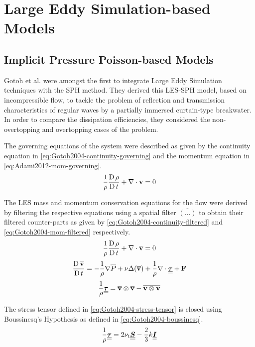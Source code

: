 \section{Large Eddy Simulation-based Models}
\subsection{Implicit Pressure Poisson-based Models}
\label{sec:Implicit-Pressure-Poisson-based-Models}
Gotoh et al. \parencite{Gotoh2004} were amongst the first to integrate Large Eddy Simulation techniques with the SPH method. They derived this LES-SPH model, based on incompressible flow, to tackle the problem of reflection and transmission characteristics of regular waves by a partially immersed curtain-type breakwater. In order to compare the dissipation efficiencies, they considered the non-overtopping and overtopping cases of the problem.

The governing equations of the system were described as given by the continuity equation in \ref{eq:Gotoh2004-continuity-governing} and the momentum equation in \ref{eq:Adami2012-mom-governing}.
\begin{equation}
	\frac{1}{\rho} \frac{\operatorname{D} \rho}{\operatorname{D} t} + \nabla \cdot \mathbf{v} = 0
	\label{eq:Gotoh2004-continuity-governing}
\end{equation}

The LES mass and momentum conservation equations for the flow were derived by filtering the respective equations using a spatial filter $\overline{(...)}$ to obtain their filtered counter-parts as given by \ref{eq:Gotoh2004-continuity-filtered} and \ref{eq:Gotoh2004-mom-filtered} respectively.
\begin{equation}
	\frac{1}{\rho} \frac{\operatorname{D} \rho}{\operatorname{D} t} + \nabla \cdot \mathbf{\overline{v}} = 0
	\label{eq:Gotoh2004-continuity-filtered}
\end{equation}
\begin{equation}
	\frac{\operatorname{D} \mathbf{\overline{v}}}{\operatorname{D} t} = -\frac{1}{\rho}\nabla \overline{P} + \nu \Delta ( \mathbf{\overline{v}} ) + \frac{1}{\rho}\nabla\cdot\underline{\underline{\bm{\tau}}} + \mathbf{F}
	\label{eq:Gotoh2004-mom-filtered}
\end{equation}
\begin{equation}
	\frac{1}{\rho} \underline{\underline{\bm{\tau}}} = \mathbf{\overline{v}} \otimes \mathbf{\overline{v}} - \overline{\mathbf{v} \otimes \mathbf{v}}
	\label{eq:Gotoh2004-stress-tensor}
\end{equation}

The stress tensor defined in \ref{eq:Gotoh2004-stress-tensor} is closed using Boussinesq's Hypothesis as defined in \ref{eq:Gotoh2004-boussinesq}.
\begin{equation}
	\frac{1}{\rho} \underline{\underline{\bm{\tau}}} = 2\nu_t \underline{\underline{\bm{S}}} - \frac{2}{3}k\underline{\underline{\bm{I}}}
	\label{eq:Gotoh2004-boussinesq}
\end{equation}

